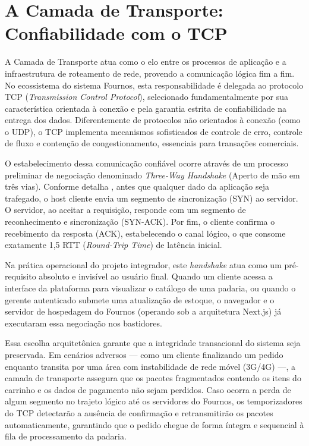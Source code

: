 \documentclass[12pt, a4paper]{article}
\begin{document}
\section{A Camada de Transporte: Confiabilidade com o TCP}

A Camada de Transporte atua como o elo entre os processos de aplicação e a infraestrutura de roteamento de rede, provendo a comunicação lógica fim a fim. No ecossistema do sistema Fournos, esta responsabilidade é delegada ao protocolo TCP (\textit{Transmission Control Protocol}), selecionado fundamentalmente por sua característica orientada à conexão e pela garantia estrita de confiabilidade na entrega dos dados. Diferentemente de protocolos não orientados à conexão (como o UDP), o TCP implementa mecanismos sofisticados de controle de erro, controle de fluxo e contenção de congestionamento, essenciais para transações comerciais.

O estabelecimento dessa comunicação confiável ocorre através de um processo preliminar de negociação denominado \textit{Three-Way Handshake} (Aperto de mão em três vias). Conforme detalha \cite{forouzan}, antes que qualquer dado da aplicação seja trafegado, o host cliente envia um segmento de sincronização (SYN) ao servidor. O servidor, ao aceitar a requisição, responde com um segmento de reconhecimento e sincronização (SYN-ACK). Por fim, o cliente confirma o recebimento da resposta (ACK), estabelecendo o canal lógico, o que consome exatamente 1,5 RTT (\textit{Round-Trip Time}) de latência inicial.

Na prática operacional do projeto integrador, este \textit{handshake} atua como um pré-requisito absoluto e invisível ao usuário final. Quando um cliente acessa a interface da plataforma para visualizar o catálogo de uma padaria, ou quando o gerente autenticado submete uma atualização de estoque, o navegador e o servidor de hospedagem do Fournos (operando sob a arquitetura Next.js) já executaram essa negociação nos bastidores. 

Essa escolha arquitetônica garante que a integridade transacional do sistema seja preservada. Em cenários adversos --- como um cliente finalizando um pedido enquanto transita por uma área com instabilidade de rede móvel (3G/4G) ---, a camada de transporte assegura que os pacotes fragmentados contendo os itens do carrinho e os dados de pagamento não sejam perdidos. Caso ocorra a perda de algum segmento no trajeto lógico até os servidores do Fournos, os temporizadores do TCP detectarão a ausência de confirmação e retransmitirão os pacotes automaticamente, garantindo que o pedido chegue de forma íntegra e sequencial à fila de processamento da padaria.
\end{document}
